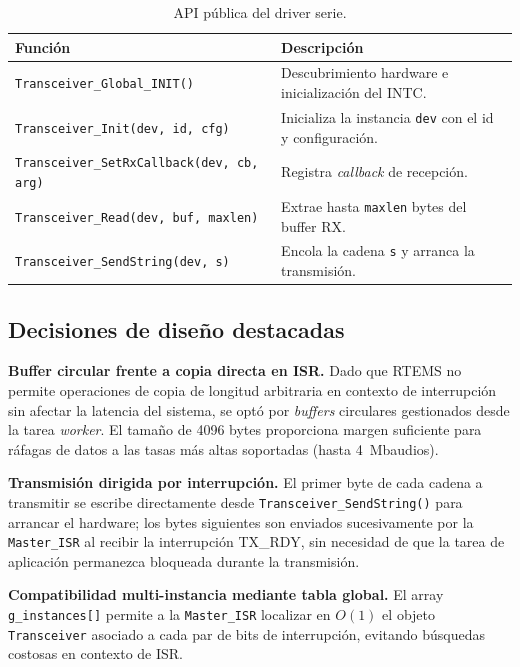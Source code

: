 \begin{table}[H]
    \centering
    \begin{tabular}{ll}
        \hline
        \textbf{Función} & \textbf{Descripción} \\
        \hline
        \texttt{Transceiver\_Global\_INIT()} & Descubrimiento hardware e inicialización del INTC. \\
        \texttt{Transceiver\_Init(dev, id, cfg)} & Inicializa la instancia \texttt{dev} con el id y configuración. \\
        \texttt{Transceiver\_SetRxCallback(dev, cb, arg)} & Registra \textit{callback} de recepción. \\
        \texttt{Transceiver\_Read(dev, buf, maxlen)} & Extrae hasta \texttt{maxlen} bytes del buffer RX. \\
        \texttt{Transceiver\_SendString(dev, s)} & Encola la cadena \texttt{s} y arranca la transmisión. \\
        \hline
    \end{tabular}
    \caption{API pública del driver serie.}
    \label{tab:api}
\end{table}

\subsection{Decisiones de diseño destacadas}

\textbf{Buffer circular frente a copia directa en ISR.} Dado que RTEMS no permite operaciones de
copia de longitud arbitraria en contexto de interrupción sin afectar la latencia del sistema, se
optó por \textit{buffers} circulares gestionados desde la tarea \textit{worker}. El tamaño de 4096 bytes
proporciona margen suficiente para ráfagas de datos a las tasas más altas soportadas (hasta
4~Mbaudios).

\textbf{Transmisión dirigida por interrupción.} El primer byte de cada cadena a transmitir se escribe
directamente desde \texttt{Transceiver\_SendString()} para arrancar el hardware; los bytes
siguientes son enviados sucesivamente por la \texttt{Master\_ISR} al recibir la interrupción
TX\_RDY, sin necesidad de que la tarea de aplicación permanezca bloqueada durante la
transmisión.

\textbf{Compatibilidad multi-instancia mediante tabla global.} El array \texttt{g\_instances[]} permite
a la \texttt{Master\_ISR} localizar en $O(1)$ el objeto \texttt{Transceiver} asociado a cada par de bits de
interrupción, evitando búsquedas costosas en contexto de ISR.

